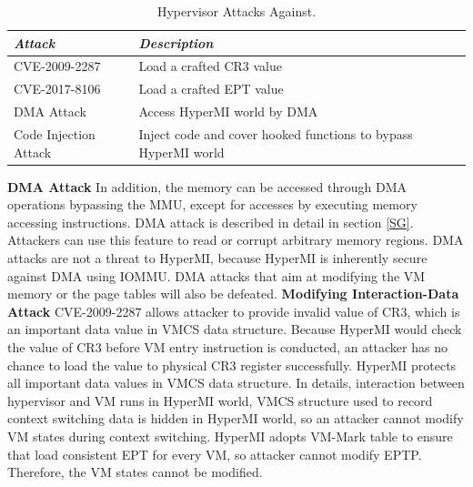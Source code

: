 \documentclass[conference]{IEEEtran}
\begin{document}
\begin{table}
\centering
\caption{Hypervisor Attacks Against.}\label{tab3}
\begin{tabular}{p{2.4cm}|p{5.5cm}}
\hline
{\itshape\bfseries Attack} & {\itshape\bfseries Description} \\
\hline
CVE-2009-2287 & Load a crafted CR3 value\\
\hline
CVE-2017-8106 & Load a crafted EPT value \\
\hline
DMA Attack & Access HyperMI world by DMA \\
\hline
Code Injection Attack & Inject code and cover hooked functions to bypass HyperMI world \\
\hline
\end{tabular}
\end{table}
\textbf{DMA Attack}
In addition, the memory can be accessed through DMA operations bypassing the MMU, except for accesses by executing memory accessing instructions. DMA attack is described in detail in section \ref{SG}. Attackers can use this feature to read or corrupt arbitrary memory regions. DMA attacks are not a threat to HyperMI, because HyperMI is inherently secure against DMA using IOMMU. DMA attacks that aim at modifying the VM memory or the page tables will also be defeated.
\textbf{Modifying Interaction-Data Attack}
CVE-2009-2287 allows attacker to provide invalid value of CR3, which is an important data value in VMCS data structure. Because HyperMI would check the value of CR3 before VM entry instruction is conducted, an attacker has no chance to load the value to physical CR3 register successfully. HyperMI protects all important data values in VMCS data structure. In details, interaction between hypervisor and VM runs in HyperMI world, VMCS structure used to record context switching data is hidden in HyperMI world, so an attacker cannot modify VM states during context switching. HyperMI adopts VM-Mark table to ensure that load consistent EPT for every VM, so attacker cannot modify EPTP. Therefore, the VM states cannot be modified. 
\end{document}
